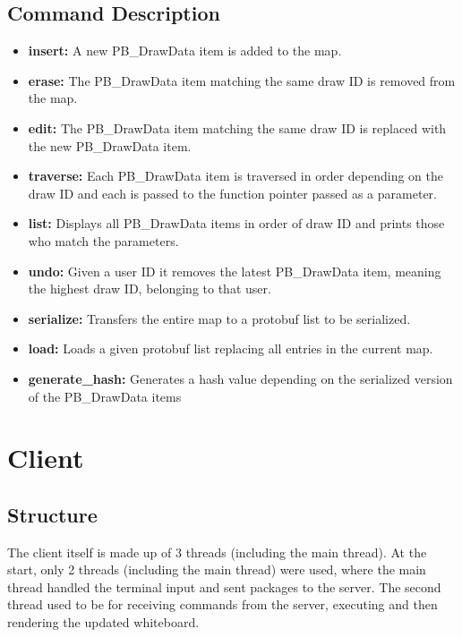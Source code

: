 \documentclass[12pt, a4paper]{report}
\begin{document}
\section{Command Description} \label{Commands}
\begin{itemize}
    \item \textbf{insert:} A new PB\_DrawData item is added to the map.
    \item \textbf{erase:} The PB\_DrawData item matching the same draw ID is removed from the map.
    \item \textbf{edit:} The PB\_DrawData item matching the same draw ID is replaced with the new PB\_DrawData item.
    \item \textbf{traverse:} Each PB\_DrawData item is traversed in order depending on the draw ID and each is passed to the function pointer passed as a parameter.
    \item \textbf{list:} Displays all PB\_DrawData items in order of draw ID and prints those who match the parameters.
    \item \textbf{undo:} Given a user ID it removes the latest PB\_DrawData item, meaning the highest draw ID, belonging to that user.
    \item \textbf{serialize:} Transfers the entire map to a protobuf list to be serialized.
    \item \textbf{load:} Loads a given protobuf list replacing all entries in the current map.
    \item \textbf{generate\_hash:} Generates a hash value depending on the serialized version of the PB\_DrawData items 
\end{itemize}

\chapter{Client}


\section{Structure}
The client itself is made up of 3 threads (including the main thread). At the start, only 2 threads (including the main thread) were used, where the main thread handled the terminal input and sent packages to the server. The second thread used to be for receiving commands from the server, executing and then rendering the updated whiteboard. 
\end{document}
